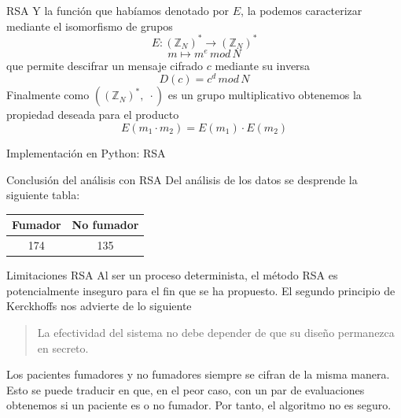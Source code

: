 \documentclass{beamer}
\begin{document}
\begin{frame}{RSA} 
    Y la función que habíamos denotado por $E$, la podemos caracterizar mediante el isomorfismo de grupos 
    $$ E: (\mathbb{Z}_N)^* \longrightarrow (\mathbb{Z}_N)^* $$
    $$ m \mapsto m^e\, mod \, N $$
    que permite descifrar un mensaje cifrado $c$ mediante su inversa
    $$D(c) = c^d \, mod \, N$$
    Finalmente como $((\mathbb{Z}_N)^*,\; \cdot)$ es un grupo multiplicativo obtenemos la propiedad deseada para el producto 
    $$E(m_1 \cdot m_2) = E(m_1) \cdot E(m_2)$$
\end{frame}

\begin{frame}{Implementación en Python: RSA}

\end{frame}

%

%

%

\begin{frame}{Conclusión del análisis con RSA}
Del análisis de los datos se desprende la siguiente tabla: 
\newline
\newline
\begin{center}
\begin{table}[]
\begin{tabular}{|c|c|}
\hline
\textbf{Fumador} & \textbf{No fumador} \\ \hline
174              & 135                 \\ \hline
\end{tabular}
\end{table}
\end{center}
\end{frame}

\begin{frame}{Limitaciones RSA}
Al ser un proceso determinista, el método RSA es potencialmente inseguro para el fin que se ha propuesto.
\newline
\newline
El segundo principio de Kerckhoffs nos advierte de lo siguiente
\newline
\newline
\begin{quote}
    La efectividad del sistema no debe depender de que su diseño permanezca en secreto.
\end{quote}
\newline
\newline
Los pacientes fumadores y no fumadores siempre se cifran de la misma manera. Esto se puede traducir en que, en el peor caso, con un par de evaluaciones obtenemos si un paciente es o no fumador. Por tanto, el algoritmo no es seguro.  
\end{frame}
\end{document}
